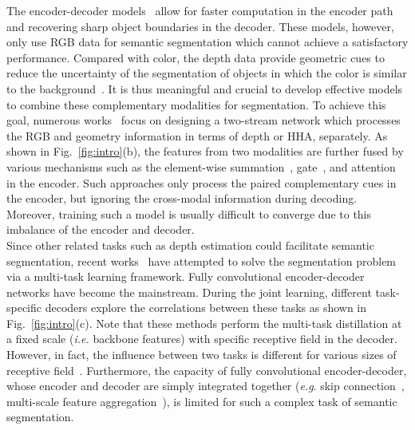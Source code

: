 \documentclass[10pt,twocolumn,letterpaper]{article}
\begin{document}
The encoder-decoder models~\cite{Noh:ICCV15,Badri:TPAMI17, Kendall:BMVC17,Lee:ICCV17,Tang:arXiv20} allow for faster computation in the encoder path and recovering sharp object boundaries in the decoder. These models, however, only use RGB data for semantic segmentation which cannot achieve a satisfactory performance.
Compared with color, the depth data provide geometric cues to reduce the uncertainty of the segmentation of objects in which the color is similar to the background~\cite{Hazirbas:ACCV17}. It is thus meaningful and crucial to develop effective models to combine these complementary modalities for segmentation. To achieve this goal, numerous works~\cite{Hazirbas:ACCV17,Cheng:CVPR17,Jiang:arXiv18,Hu:ICIP19,Chen:arXiv20,Xing:ECCV20,Chen:ECCV20} focus on designing a two-stream network which processes the RGB and geometry information in terms of depth or HHA, separately. As shown in Fig.~\ref{fig:intro}(b), the features from two modalities are further fused by various mechanisms such as the element-wise summation~\cite{Hazirbas:ACCV17,Jiang:arXiv18}, gate~\cite{Cheng:CVPR17,Chen:ECCV20}, and attention~\cite{Hu:ICIP19,Seichter:arXiv20} in the encoder. Such approaches only process the paired complementary cues in the encoder, but ignoring the cross-modal information during decoding. Moreover, training such a model is usually difficult to converge due to this imbalance of the encoder and decoder.
\\
Since other related tasks such as depth estimation could facilitate semantic segmentation, recent works~\cite{Eigen:ICCV15,Kong:CVPR18,Zhang:ECCV18,Nekrasov:ICRA19,Zhang:CVPR19,Zhou:CVPR20} have attempted to solve the segmentation problem via a multi-task learning framework. Fully convolutional encoder-decoder networks have become the mainstream. During the joint learning, different task-specific decoders explore the correlations between these tasks as shown in Fig.~\ref{fig:intro}(c). Note that these methods perform the multi-task distillation at a fixed scale (\textit{i.e.} backbone features) with specific receptive field in the decoder. However, in fact, the influence between two tasks is different for various sizes of receptive field~\cite{Vandenhende:ECCV20}. Furthermore, the capacity of fully convolutional encoder-decoder, whose encoder and decoder are simply integrated together (\emph{e.g}. skip connection~\cite{Zhang:ECCV18,Nekrasov:ICRA19,Zhou:CVPR20}, multi-scale feature aggregation~\cite{Zhang:CVPR19}), is limited for such a complex task of semantic segmentation.
\end{document}

